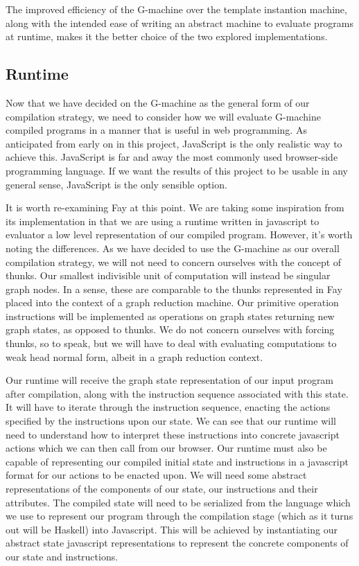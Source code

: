 The improved efficiency of the G-machine over the template
instantion machine, along with the intended ease of writing
an abstract machine to evaluate programs at runtime, makes
it the better choice of the two explored implementations.


\subsection{Runtime}
Now that we have decided on the G-machine as the general
form of our compilation strategy, we need to consider how
we will evaluate G-machine compiled programs in a manner
that is useful in web programming. As anticipated from
early on in this project, JavaScript is the only realistic
way to achieve this. JavaScript is far and away the most
commonly used browser-side programming language. If we
want the results of this project to be usable in any
general sense, JavaScript is the only sensible option.

It is worth re-examining Fay at this point. We are
taking some inspiration from its implementation in
that we are using a runtime written in javascript to 
evaluator a low level representation of our compiled
program. However, it's worth noting the differences.
As we have decided to use the G-machine as our overall
compilation strategy, we 
will not need to concern ourselves with the
concept of thunks. Our smallest indivisible unit of
computation will instead be singular graph nodes. 
In a sense, these are comparable to the thunks
represented in Fay placed into the context of a graph
reduction machine. Our primitive operation instructions
will be implemented as operations on graph states
returning new graph states, as opposed to thunks. We
do not concern ourselves with forcing thunks, so to
speak, but we will have to deal with evaluating 
computations to weak head normal form, albeit in a 
graph reduction context.

Our runtime will receive the graph state representation
of our input program after compilation, along with the
instruction sequence associated with this state. It will
have to iterate through the instruction sequence, enacting
the actions specified by the instructions upon our state.
We can see that our runtime will need to understand how
to interpret these instructions into concrete javascript
actions which we can then call from our browser. Our 
runtime must also be capable of representing our compiled
initial state and instructions in a javascript format 
for our actions to be enacted upon. We will 
need some abstract representations of the components of
our state, our instructions and their attributes. The
compiled state will need to be serialized from the 
language which we use to represent our program through
the compilation stage (which as it turns out will be
Haskell) into Javascript. This will be achieved by
instantiating our abstract state javascript
representations to represent the concrete components of
our state and instructions.

